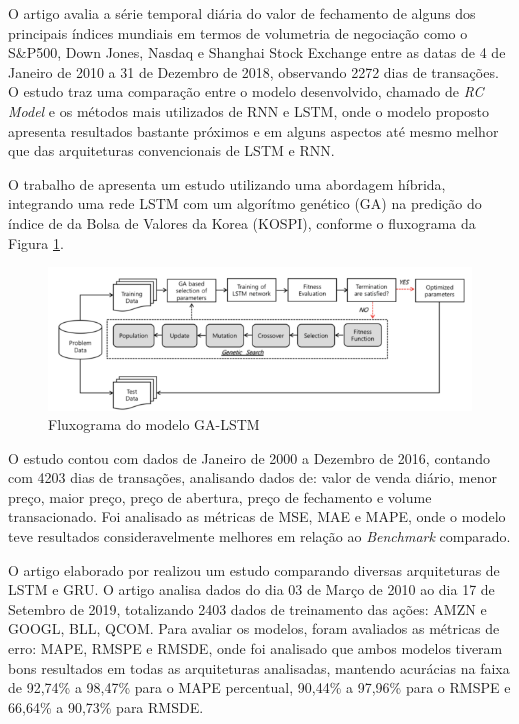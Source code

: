 O artigo \cite{tc6} avalia a série temporal diária do valor de fechamento de alguns dos principais índices mundiais em termos de volumetria de negociação como o {S\&P500}, Down Jones, Nasdaq e Shanghai Stock Exchange entre as datas de 4 de Janeiro de 2010 a 31 de Dezembro de 2018, observando 2272 dias de transações. O estudo traz uma comparação entre o modelo desenvolvido, chamado de \emph{RC Model} e os métodos mais utilizados de RNN e LSTM, onde o modelo proposto apresenta resultados bastante próximos e em alguns aspectos até mesmo melhor que das arquiteturas convencionais de LSTM e RNN.

O trabalho de \cite{tc2} apresenta um estudo utilizando uma abordagem híbrida, integrando uma rede LSTM com um algorítmo genético (GA) na predição do índice de da Bolsa de Valores da Korea (KOSPI), conforme o fluxograma da Figura \ref{fluxo_GA-LSTM}.

\begin{figure}[!h]
	\centering
	\label{fluxo_GA-LSTM}
		\includegraphics[keepaspectratio=true,scale=0.6]{figuras/fluxograma_ga_lstm.png}
	\caption{ Fluxograma do modelo GA-LSTM \cite{tc2}}
\end{figure}

O estudo contou com dados de Janeiro de 2000 a Dezembro de 2016, contando com 4203 dias de transações, analisando dados de: valor de venda diário, menor preço, maior preço, preço de abertura, preço de fechamento e volume transacionado. Foi analisado as métricas de MSE, MAE e MAPE, onde o modelo teve resultados consideravelmente melhores em relação ao \emph{Benchmark} comparado.


O artigo elaborado por \cite{tc3} realizou um estudo comparando diversas arquiteturas de LSTM e GRU. O artigo analisa dados do dia 03 de Março de 2010 ao dia 17 de Setembro de 2019, totalizando 2403 dados de treinamento das ações: AMZN e GOOGL, BLL, QCOM. Para avaliar os modelos, foram avaliados as métricas de erro: MAPE, RMSPE e RMSDE, onde foi analisado que ambos modelos tiveram bons resultados em todas as arquiteturas analisadas, mantendo acurácias na faixa de 92,74\% a 98,47\% para o MAPE percentual, 90,44\% a 97,96\% para o RMSPE e 66,64\% a 90,73\% para RMSDE.

